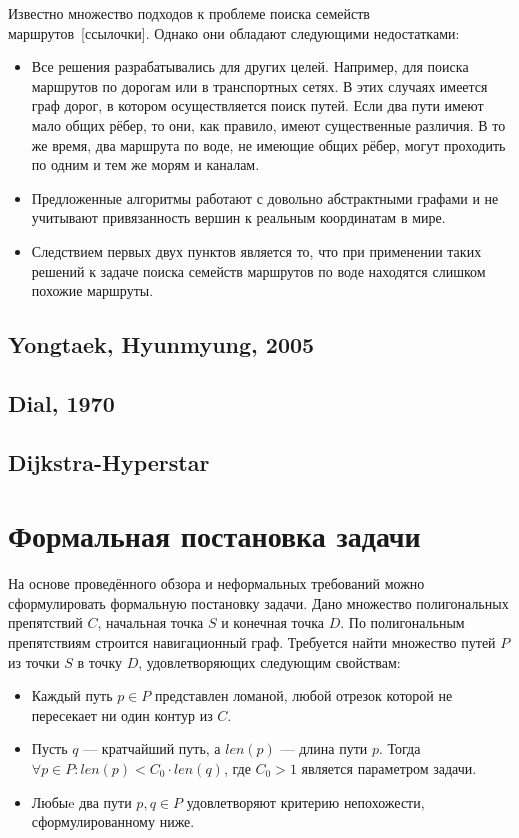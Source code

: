 Известно множество подходов к проблеме поиска семейств
маршрутов~[ссылочки]. Однако они обладают следующими недостатками:
  
\begin{itemize}
    \item Все решения разрабатывались для других целей. Например, для
      поиска маршрутов по дорогам или в транспортных сетях. В этих
      случаях имеется граф дорог, в котором осуществляется поиск путей.
      Если два пути имеют мало общих рёбер, то они, как правило, имеют
      существенные различия. В то же время, два маршрута по воде, не
      имеющие общих рёбер, могут проходить по одним и тем же морям и
      каналам.
    \item Предложенные алгоритмы работают с довольно абстрактными
      графами и не учитывают привязанность вершин к реальным координатам
      в мире.
    \item Следствием первых двух пунктов является то, что при
      применении таких решений к задаче поиска семейств маршрутов по
      воде находятся слишком похожие маршруты.
\end{itemize}

\FloatBarrier

\subsection{Yongtaek, Hyunmyung, 2005}

\FloatBarrier

\subsection{Dial, 1970}

\FloatBarrier

\subsection{Dijkstra-Hyperstar}

\FloatBarrier

\section{Формальная постановка задачи}

На основе проведённого обзора и неформальных требований можно
сформулировать формальную постановку задачи. Дано множество
полигональных препятствий $C$, начальная точка $S$ и конечная точка
$D$. По полигональным препятствиям строится навигационный граф.
Требуется найти множество путей $P$ из точки $S$ в точку $D$,
удовлетворяющих следующим свойствам:
\begin{itemize}
  \item Каждый путь $p \in P$ представлен ломаной, любой отрезок
    которой не пересекает ни один контур из $C$.
  \item Пусть $q$ --- кратчайший путь, а $len(p)$ --- длина пути $p$.
    Тогда $\forall p \in P: len(p) < C_0 \cdot len(q)$, где $C_0 > 1$
    является параметром задачи.
  \item Любыe два пути $p, q \in P$ удовлетворяют критерию
    непохожести, сформулированному ниже.
\end{itemize}


